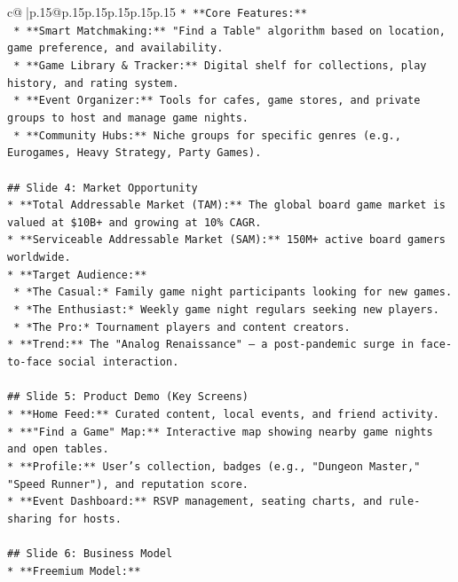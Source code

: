 \documentclass{article}
\begin{document}
{\begin{supertabular}{c@{$\;$}|p{.15\linewidth}@{}p{.15\linewidth}p{.15\linewidth}p{.15\linewidth}p{.15\linewidth}p{.15\linewidth}}
{{{\texttt{*   **Core Features:**} \\
\texttt{    *   **Smart Matchmaking:** "Find a Table" algorithm based on location, game preference, and availability.} \\
\texttt{    *   **Game Library \& Tracker:** Digital shelf for collections, play history, and rating system.} \\
\texttt{    *   **Event Organizer:** Tools for cafes, game stores, and private groups to host and manage game nights.} \\
\texttt{    *   **Community Hubs:** Niche groups for specific genres (e.g., Eurogames, Heavy Strategy, Party Games).} \\
\\ 
\texttt{\#\# Slide 4: Market Opportunity} \\
\texttt{*   **Total Addressable Market (TAM):** The global board game market is valued at \$10B+ and growing at 10\% CAGR.} \\
\texttt{*   **Serviceable Addressable Market (SAM):** 150M+ active board gamers worldwide.} \\
\texttt{*   **Target Audience:**} \\
\texttt{    *   *The Casual:* Family game night participants looking for new games.} \\
\texttt{    *   *The Enthusiast:* Weekly game night regulars seeking new players.} \\
\texttt{    *   *The Pro:* Tournament players and content creators.} \\
\texttt{*   **Trend:** The "Analog Renaissance" – a post{-}pandemic surge in face{-}to{-}face social interaction.} \\
\\ 
\texttt{\#\# Slide 5: Product Demo (Key Screens)} \\
\texttt{*   **Home Feed:** Curated content, local events, and friend activity.} \\
\texttt{*   **"Find a Game" Map:** Interactive map showing nearby game nights and open tables.} \\
\texttt{*   **Profile:** User's collection, badges (e.g., "Dungeon Master," "Speed Runner"), and reputation score.} \\
\texttt{*   **Event Dashboard:** RSVP management, seating charts, and rule{-}sharing for hosts.} \\
\\ 
\texttt{\#\# Slide 6: Business Model} \\
\texttt{*   **Freemium Model:**} \\
}}}
\end{supertabular}}
\end{document}
